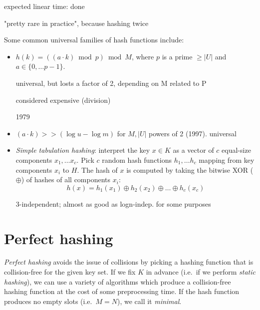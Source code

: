 expected linear time: done

"pretty rare in practice", because hashing twice

%
%
%

Some common universal families of hash functions include:
\begin{itemize}
\item $h(k)=((a\cdot k)\bmod p)\bmod M$, where $p$ is a prime $\geq |U|$
	and $a\in\{0,\ldots p-1\}$. %

	universal, but losts a factor of 2, depending on M related to P

	considered expensive (division)

	1979

\item $(a\cdot k) >> (\log u-\log m)$ for $M, |U|$ powers of 2 (1997).
	universal

\item \emph{Simple tabulation hashing}: interpret the key $x\in K$ as a vector
	of $c$ equal-size components $x_1,\ldots x_c$. Pick $c$ random hash
	functions $h_1,\ldots h_c$ mapping from key components $x_i$ to $H$.
	The hash of $x$ is computed by taking the bitwise XOR ($\oplus$)
	of hashes of all components $x_i$:
	$$h(x)=h_1(x_1)\oplus h_2(x_2)\oplus \ldots \oplus h_c(x_c)$$


	3-independent; almost as good as logn-indep. for some purposes

\end{itemize}

\section{Perfect hashing}
\emph{Perfect hashing} avoids the issue of collisions by picking a hashing
function that is collision-free for the given key set. If we fix $K$
in advance (i.e.\ if we perform \emph{static hashing}), we can use a variety
of algorithms which produce a collision-free hashing function at the cost
of some preprocessing time. If the hash function produces no empty slots
(i.e.\ $M=N$), we call it \emph{minimal}.

